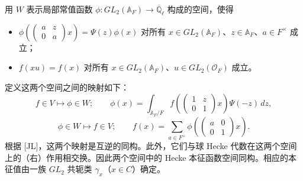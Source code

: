 用 $W$ 表示局部常值函数 $\phi:GL_2(\mathbb{A}_F)\to\overline{\mathbb{Q}}_\ell$ 构成的空间，使得
\begin{itemize}[leftmargin=2.2em,itemsep=2pt,topsep=2pt]
\item[(1$'$)] $\phi\left(\begin{pmatrix}a&z\\ 0&a\end{pmatrix}x\right)=\Psi(z)\phi(x)$ 对所有 $x\in GL_2(\mathbb{A}_F)$、$z\in\mathbb{A}_F$、$a\in F^\times$ 成立；
\item[(2$'$)] $f(xu)=f(x)$ 对所有 $x\in GL_2(\mathbb{A}_F)$、$u\in GL_2(\mathcal{O}_F)$ 成立。
\end{itemize}

定义这两个空间之间的映射如下：
\begin{equation}\tag{11.1}
f\in V\mapsto\phi\in W;\qquad \phi(x)=\int_{\mathbb{A}_F/F}f\left(\begin{pmatrix}1&z\\ 0&1\end{pmatrix}x\right)\Psi(-z)\,dz,
\end{equation}
\begin{equation}\tag{11.2}
\phi\in W\mapsto f\in V;\qquad f(x)=\sum_{a\in F^\times}\phi\left(\begin{pmatrix}a&0\\ 0&1\end{pmatrix}x\right).
\end{equation}
根据 [JL]，这两个映射是互逆的同构。此外，它们与球 Hecke 代数在这两个空间上的（右）作用相交换。因此两个空间中的 Hecke 本征函数空间同构。相应的本征值由一族 $GL_2$ 共轭类 $\gamma_x$（$x\in C$）确定。


